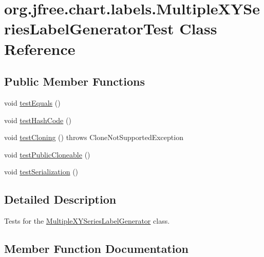 \hypertarget{classorg_1_1jfree_1_1chart_1_1labels_1_1_multiple_x_y_series_label_generator_test}{}\section{org.\+jfree.\+chart.\+labels.\+Multiple\+X\+Y\+Series\+Label\+Generator\+Test Class Reference}
\label{classorg_1_1jfree_1_1chart_1_1labels_1_1_multiple_x_y_series_label_generator_test}
\subsection*{Public Member Functions}
\begin{DoxyCompactItemize}
\item 
void \mbox{\hyperlink{classorg_1_1jfree_1_1chart_1_1labels_1_1_multiple_x_y_series_label_generator_test_ae73527d0a75916d13889956ed9ed9420}{test\+Equals}} ()
\item 
void \mbox{\hyperlink{classorg_1_1jfree_1_1chart_1_1labels_1_1_multiple_x_y_series_label_generator_test_a40fead7e61444b4dc06c1b694392c175}{test\+Hash\+Code}} ()
\item 
void \mbox{\hyperlink{classorg_1_1jfree_1_1chart_1_1labels_1_1_multiple_x_y_series_label_generator_test_a623e54c364b7d5f74d2bd1d5e6f4e920}{test\+Cloning}} ()  throws Clone\+Not\+Supported\+Exception 
\item 
void \mbox{\hyperlink{classorg_1_1jfree_1_1chart_1_1labels_1_1_multiple_x_y_series_label_generator_test_a5ccc9e1a58818caed9c2be77e9769afa}{test\+Public\+Cloneable}} ()
\item 
void \mbox{\hyperlink{classorg_1_1jfree_1_1chart_1_1labels_1_1_multiple_x_y_series_label_generator_test_a033c772aedb22901ddab2daafb278d02}{test\+Serialization}} ()
\end{DoxyCompactItemize}


\subsection{Detailed Description}
Tests for the \mbox{\hyperlink{classorg_1_1jfree_1_1chart_1_1labels_1_1_multiple_x_y_series_label_generator}{Multiple\+X\+Y\+Series\+Label\+Generator}} class. 

\subsection{Member Function Documentation}
\mbox{\label{classorg_1_1jfree_1_1chart_1_1labels_1_1_multiple_x_y_series_label_generator_test_a623e54c364b7d5f74d2bd1d5e6f4e920}} 
